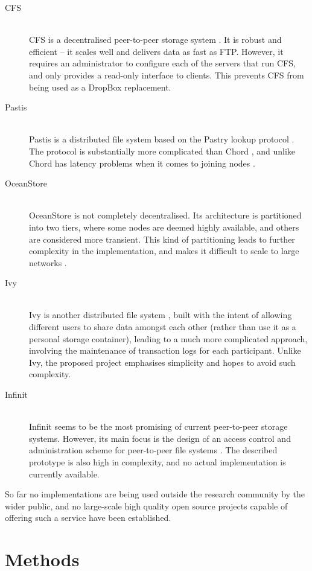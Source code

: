 \documentclass[8pt,a4paper]{article}
\begin{document}
\begin{description}
  \item[CFS] \hfill \\ 
  CFS is a decentralised peer-to-peer storage system \cite{cfs}. It is robust and efficient -- it scales well and delivers data as fast as FTP. However, it requires an administrator to configure each of the servers that run CFS, and only provides a read-only interface to clients. This prevents CFS from being used as a DropBox replacement. 
  \item[Pastis] \hfill \\
  Pastis is a distributed file system based on the Pastry lookup protocol \cite{pastis}. The protocol is substantially more complicated than Chord \cite{chord}, and unlike Chord has latency problems when it comes to joining nodes \cite{chordalt}.
  \item[OceanStore] \hfill \\
  OceanStore \cite{oceanstore} is not completely decentralised. Its architecture is partitioned into two tiers, where some nodes are deemed highly available, and others are considered more transient. This kind of partitioning leads to further complexity in the implementation, and makes it difficult to scale to large networks \cite{towards}.
  \item[Ivy] \hfill \\
  Ivy is another distributed file system \cite{ivy}, built with the intent of allowing different users to share data amongst each other (rather than use it as a personal storage container), leading to a much more complicated approach, involving the maintenance of transaction logs for each participant. Unlike Ivy, the proposed project emphasises simplicity and hopes to avoid such complexity.
  \item[Infinit] \hfill \\ 
  Infinit seems to be the most promising of current peer-to-peer storage systems. However, its main focus is the design of an access control and administration scheme for peer-to-peer file systems \cite{towards}. The described prototype is also high in complexity, and no actual implementation is currently available.
\end{description}

So far no implementations are being used outside the research community by the wider public, and no large-scale high quality open source projects capable of offering such a service have been established.

\section{Methods}
\end{document}
